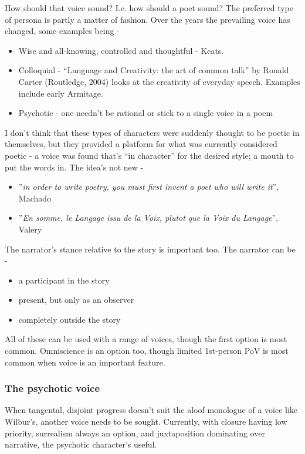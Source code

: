 \documentclass[11pt]{article}
\begin{document}
How should that voice sound? I.e. how should a poet sound? The preferred type of persona is partly a matter of fashion. Over the years the prevailing voice has changed, some examples being - 
\begin{itemize}
\item Wise and all-knowing, controlled and thoughtful - Keats.
\item Colloquial - ``Language and Creativity: the art of common talk'' by Ronald Carter (Routledge, 2004) looks at the creativity of everyday speech.  Examples include early Armitage.
\item Psychotic - one needn't be rational or stick to a single voice in a poem

\end{itemize}


I don't think that these types of characters were suddenly thought to be poetic in themselves, but they provided a platform for what was currently considered poetic - a voice was found that's ``in character'' for the desired style; a mouth to put the words in. The idea's not new - 
\begin{itemize} 
\item ''\textit{in order to write poetry, you must first invent a poet who will write it}'', Machado
\item ''\textit{En somme, le Langage issu de la Voix, plutot que la Voix du Langage}'', Valery
\end{itemize}


The narrator's stance relative to the story is important too. The narrator can be -
\begin{itemize}
\item a participant in the story
\item present, but only as an observer
\item completely outside the story
\end{itemize}

All of these can be used with a range of voices, though the first option is most common. Omniscience is an option too, though limited 1st-person PoV is most common when voice is an important feature.

\subsubsection*{The psychotic voice}


When tangental, disjoint progress doesn't suit the aloof monologue of a voice like Wilbur's, another voice needs to be sought. Currently, with closure having low priority, surrealism always an option,  and juxtaposition dominating over narrative, the psychotic character's useful.
\end{document}
